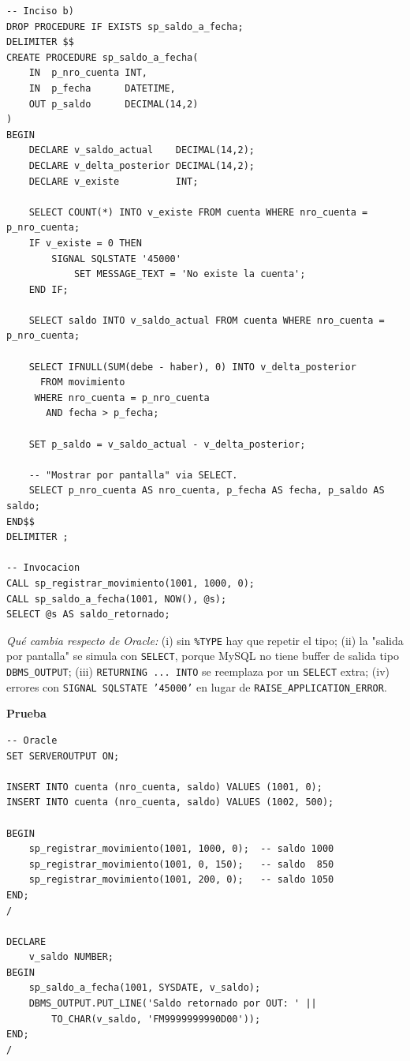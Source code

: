 \documentclass[11pt,a4paper]{article}
\newcommand{\itemcabecera}[1]{\noindent\textbf{#1}\par\medskip}
\newcommand{\bloquePrueba}{\itemcabecera{Prueba}}
\begin{document}
\begin{lstlisting}
-- Inciso b)
DROP PROCEDURE IF EXISTS sp_saldo_a_fecha;
DELIMITER $$
CREATE PROCEDURE sp_saldo_a_fecha(
    IN  p_nro_cuenta INT,
    IN  p_fecha      DATETIME,
    OUT p_saldo      DECIMAL(14,2)
)
BEGIN
    DECLARE v_saldo_actual    DECIMAL(14,2);
    DECLARE v_delta_posterior DECIMAL(14,2);
    DECLARE v_existe          INT;

    SELECT COUNT(*) INTO v_existe FROM cuenta WHERE nro_cuenta = p_nro_cuenta;
    IF v_existe = 0 THEN
        SIGNAL SQLSTATE '45000'
            SET MESSAGE_TEXT = 'No existe la cuenta';
    END IF;

    SELECT saldo INTO v_saldo_actual FROM cuenta WHERE nro_cuenta = p_nro_cuenta;

    SELECT IFNULL(SUM(debe - haber), 0) INTO v_delta_posterior
      FROM movimiento
     WHERE nro_cuenta = p_nro_cuenta
       AND fecha > p_fecha;

    SET p_saldo = v_saldo_actual - v_delta_posterior;

    -- "Mostrar por pantalla" via SELECT.
    SELECT p_nro_cuenta AS nro_cuenta, p_fecha AS fecha, p_saldo AS saldo;
END$$
DELIMITER ;

-- Invocacion
CALL sp_registrar_movimiento(1001, 1000, 0);
CALL sp_saldo_a_fecha(1001, NOW(), @s);
SELECT @s AS saldo_retornado;
\end{lstlisting}

\textit{Qué cambia respecto de Oracle:} (i) sin \texttt{\%TYPE} hay que repetir el tipo; (ii) la "salida por pantalla" se simula con \texttt{SELECT}, porque MySQL no tiene buffer de salida tipo \texttt{DBMS\_OUTPUT}; (iii) \texttt{RETURNING ... INTO} se reemplaza por un \texttt{SELECT} extra; (iv) errores con \texttt{SIGNAL SQLSTATE '45000'} en lugar de \texttt{RAISE\_APPLICATION\_ERROR}.

\bloquePrueba

\begin{lstlisting}
-- Oracle
SET SERVEROUTPUT ON;

INSERT INTO cuenta (nro_cuenta, saldo) VALUES (1001, 0);
INSERT INTO cuenta (nro_cuenta, saldo) VALUES (1002, 500);

BEGIN
    sp_registrar_movimiento(1001, 1000, 0);  -- saldo 1000
    sp_registrar_movimiento(1001, 0, 150);   -- saldo  850
    sp_registrar_movimiento(1001, 200, 0);   -- saldo 1050
END;
/

DECLARE
    v_saldo NUMBER;
BEGIN
    sp_saldo_a_fecha(1001, SYSDATE, v_saldo);
    DBMS_OUTPUT.PUT_LINE('Saldo retornado por OUT: ' ||
        TO_CHAR(v_saldo, 'FM9999999990D00'));
END;
/
\end{lstlisting}
\end{document}
